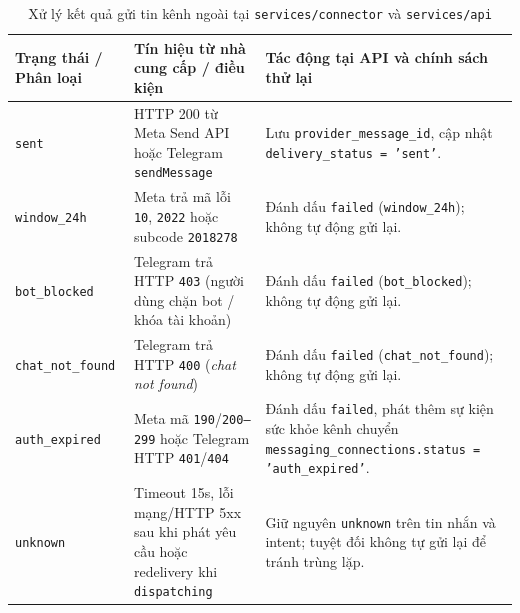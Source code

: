 \begin{table}[htbp]
  \centering
  \footnotesize
  \setlength{\tabcolsep}{4pt}
  \renewcommand{\arraystretch}{1.18}
  \caption{Xử lý kết quả gửi tin kênh ngoài tại \texttt{services/\hspace{0pt}connector} và \texttt{services/\hspace{0pt}api}}\label{tab:outbound-outcomes}
  \begin{tabularx}{\linewidth}{@{}
    >{\raggedright\arraybackslash}p{2.6cm}
    >{\raggedright\arraybackslash}p{4.8cm}
    >{\raggedright\arraybackslash}X@{}}
    \toprule
    Trạng thái / Phân loại & Tín hiệu từ nhà cung cấp / điều kiện & Tác động tại API và chính sách thử lại \\
    \midrule
    \texttt{sent} & HTTP 200 từ Meta Send API hoặc Telegram \texttt{sendMessage} & Lưu \texttt{provider\_\hspace{0pt}message\_\hspace{0pt}id}, cập nhật \texttt{delivery\_\hspace{0pt}status = 'sent'}. \\
    \texttt{window\_\hspace{0pt}24h} & Meta trả mã lỗi \texttt{10}, \texttt{2022} hoặc subcode \texttt{2018278} & Đánh dấu \texttt{failed} (\texttt{window\_\hspace{0pt}24h}); không tự động gửi lại. \\
    \texttt{bot\_\hspace{0pt}blocked} & Telegram trả HTTP \texttt{403} (người dùng chặn bot / khóa tài khoản) & Đánh dấu \texttt{failed} (\texttt{bot\_\hspace{0pt}blocked}); không tự động gửi lại. \\
    \texttt{chat\_\hspace{0pt}not\_\hspace{0pt}found} & Telegram trả HTTP \texttt{400} (\emph{chat not found}) & Đánh dấu \texttt{failed} (\texttt{chat\_\hspace{0pt}not\_\hspace{0pt}found}); không tự động gửi lại. \\
    \texttt{auth\_\hspace{0pt}expired} & Meta mã \texttt{190}/\texttt{200--299} hoặc Telegram HTTP \texttt{401}/\texttt{404} & Đánh dấu \texttt{failed}, phát thêm sự kiện sức khỏe kênh chuyển \texttt{messaging\_\hspace{0pt}connections.\hspace{0pt}status = 'auth\_\hspace{0pt}expired'}. \\
    \texttt{unknown} & Timeout 15s, lỗi mạng/HTTP 5xx sau khi phát yêu cầu hoặc redelivery khi \texttt{dispatching} & Giữ nguyên \texttt{unknown} trên tin nhắn và intent; tuyệt đối không tự gửi lại để tránh trùng lặp. \\
    \bottomrule
  \end{tabularx}
\end{table}

